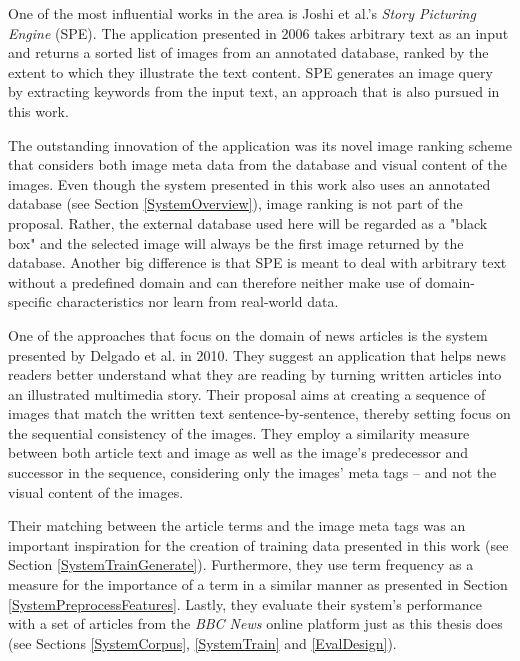 \documentclass[11pt,a4paper,twoside]{article}
\begin{document}
\bigskip

One of the most influential works in the area is Joshi et al.'s \emph{Story Picturing Engine} (SPE). \cite{Joshi2006TheIllustration} The application presented in 2006 takes arbitrary text as an input and returns a sorted list of images from an annotated database, ranked by the extent to which they illustrate the text content. SPE generates an image query by extracting keywords from the input text, an approach that is also pursued in this work. 

The outstanding innovation of the application was its novel image ranking scheme that considers both image meta data from the database and visual content of the images. Even though the system presented in this work also uses an annotated database (see Section \ref{SystemOverview}), image ranking is not part of the proposal. Rather, the external database used here will be regarded as a "black box" and the selected image will always be the first image returned by the database. Another big difference is that SPE is meant to deal with arbitrary text without a predefined domain and can therefore neither make use of domain-specific characteristics nor learn from real-world data.

\bigskip

One of the approaches that focus on the domain of news articles is the system presented by Delgado et al. in 2010. \cite{Delgado2010AutomatedExperience} They suggest an application that helps news readers better understand what they are reading by turning written articles into an illustrated multimedia story. Their proposal aims at creating a sequence of images that match the written text sentence-by-sentence, thereby setting focus on the sequential consistency of the images. They employ a similarity measure between both article text and image as well as the image's predecessor and successor in the sequence, considering only the images' meta tags -- and not the visual content of the images.

Their matching between the article terms and the image meta tags was an important inspiration for the creation of training data presented in this work (see Section \ref{SystemTrainGenerate}). Furthermore, they use term frequency as a measure for the importance of a term in a similar manner as presented in Section \ref{SystemPreprocessFeatures}. Lastly, they evaluate their system's performance with a set of articles from the \emph{BBC News} online platform just as this thesis does (see Sections \ref{SystemCorpus}, \ref{SystemTrain} and \ref{EvalDesign}).
\end{document}
